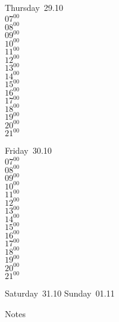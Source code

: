 \documentclass[11pt,a4paper]{book}\usepackage[]{graphicx}\usepackage[]{color}
\begin{document}
\clearpage
\begin{headerbox}
\end{headerbox}
\begin{weekdaybox}
  Thursday~29.10\\
  { 
  \vfill
  $07^{00}$\\
$08^{00}$\\
$09^{00}$\\
$10^{00}$\\
$11^{00}$\\
$12^{00}$\\
$13^{00}$\\
$14^{00}$\\
$15^{00}$\\
$16^{00}$\\
$17^{00}$\\
$18^{00}$\\
$19^{00}$\\
$20^{00}$\\
$21^{00}$\\
  }
\end{weekdaybox} 
\begin{weekdaybox}
  Friday~30.10\\
  { 
  \vfill
  $07^{00}$\\
$08^{00}$\\
$09^{00}$\\
$10^{00}$\\
$11^{00}$\\
$12^{00}$\\
$13^{00}$\\
$14^{00}$\\
$15^{00}$\\
$16^{00}$\\
$17^{00}$\\
$18^{00}$\\
$19^{00}$\\
$20^{00}$\\
$21^{00}$\\
  }
\end{weekdaybox}
\begin{weekendbox}
  Saturday~31.10
  \tcblower
  Sunday~01.11
\end{weekendbox} %
\begin{notebox}
  Notes
\end{notebox}
\clearpage
\end{document}
